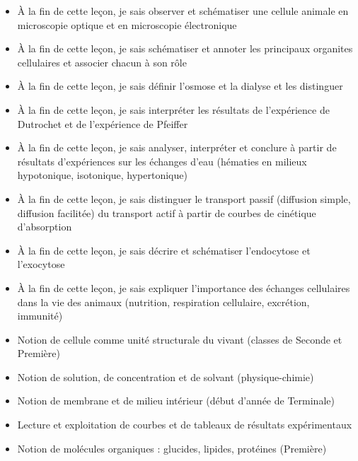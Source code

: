 \documentclass[11pt]{article}
\begin{document}
\begin{objectifs}
\begin{itemize}
\item À la fin de cette leçon, je sais observer et schématiser une cellule animale en microscopie optique et en microscopie électronique
\item À la fin de cette leçon, je sais schématiser et annoter les principaux organites cellulaires et associer chacun à son rôle
\item À la fin de cette leçon, je sais définir l'osmose et la dialyse et les distinguer
\item À la fin de cette leçon, je sais interpréter les résultats de l'expérience de Dutrochet et de l'expérience de Pfeiffer
\item À la fin de cette leçon, je sais analyser, interpréter et conclure à partir de résultats d'expériences sur les échanges d'eau (hématies en milieux hypotonique, isotonique, hypertonique)
\item À la fin de cette leçon, je sais distinguer le transport passif (diffusion simple, diffusion facilitée) du transport actif à partir de courbes de cinétique d'absorption
\item À la fin de cette leçon, je sais décrire et schématiser l'endocytose et l'exocytose
\item À la fin de cette leçon, je sais expliquer l'importance des échanges cellulaires dans la vie des animaux (nutrition, respiration cellulaire, excrétion, immunité)
\end{itemize}
\end{objectifs}

\begin{prerequis}
\begin{itemize}
\item Notion de cellule comme unité structurale du vivant (classes de Seconde et Première)
\item Notion de solution, de concentration et de solvant (physique-chimie)
\item Notion de membrane et de milieu intérieur (début d'année de Terminale)
\item Lecture et exploitation de courbes et de tableaux de résultats expérimentaux
\item Notion de molécules organiques : glucides, lipides, protéines (Première)
\end{itemize}
\end{prerequis}

\newpage
\end{document}
